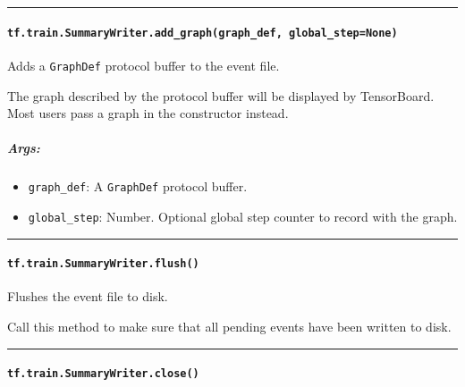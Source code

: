\begin{center}\rule{0.5\linewidth}{\linethickness}\end{center}

\paragraph{\texorpdfstring{\texttt{tf.train.SummaryWriter.add\_graph(graph\_def,\ global\_step=None)}
}{tf.train.SummaryWriter.add\_graph(graph\_def, global\_step=None) }}\label{tf.train.summarywriter.addux5fgraphgraphux5fdef-globalux5fstepnone}

Adds a \texttt{GraphDef} protocol buffer to the event file.

The graph described by the protocol buffer will be displayed by
TensorBoard. Most users pass a graph in the constructor instead.

\subparagraph{Args: }\label{args-39}

\begin{itemize}
\tightlist
\item
  \texttt{graph\_def}: A \texttt{GraphDef} protocol buffer.
\item
  \texttt{global\_step}: Number. Optional global step counter to record
  with the graph.
\end{itemize}

\begin{center}\rule{0.5\linewidth}{\linethickness}\end{center}

\paragraph{\texorpdfstring{\texttt{tf.train.SummaryWriter.flush()}
}{tf.train.SummaryWriter.flush() }}\label{tf.train.summarywriter.flush}

Flushes the event file to disk.

Call this method to make sure that all pending events have been written
to disk.

\begin{center}\rule{0.5\linewidth}{\linethickness}\end{center}

\paragraph{\texorpdfstring{\texttt{tf.train.SummaryWriter.close()}
}{tf.train.SummaryWriter.close() }}\label{tf.train.summarywriter.close}


